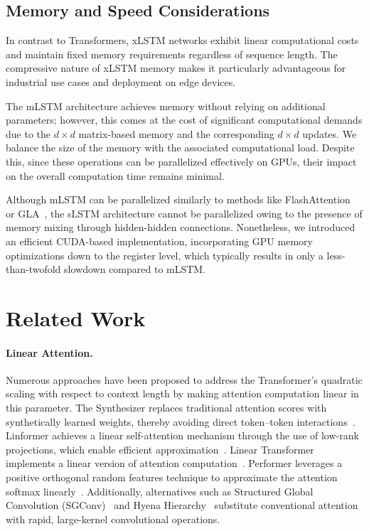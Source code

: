 \subsection{Memory and Speed Considerations}

In contrast to Transformers, xLSTM networks exhibit linear computational costs and maintain fixed memory requirements regardless of sequence length. The compressive nature of xLSTM memory makes it particularly advantageous for industrial use cases and deployment on edge devices.

The mLSTM architecture achieves memory without relying on additional parameters; however, this comes at the cost of significant computational demands due to the $d \times d$ matrix-based memory and the corresponding $d \times d$ updates. We balance the size of the memory with the associated computational load. Despite this, since these operations can be parallelized effectively on GPUs, their impact on the overall computation time remains minimal.

Although mLSTM can be parallelized similarly to methods like FlashAttention~\citep{Dao:22,Dao:23} or GLA~\citep{Yang:23arxiv}, the sLSTM architecture cannot be parallelized owing to the presence of memory mixing through hidden-hidden connections. Nonetheless, we introduced an efficient CUDA-based implementation, incorporating GPU memory optimizations down to the register level, which typically results in only a less-than-twofold slowdown compared to mLSTM.

\section{Related Work}
\label{sec:related}

\paragraph{Linear Attention.} Numerous approaches have been proposed to address the Transformer's quadratic scaling with respect to context length by making attention computation linear in this parameter. The Synthesizer replaces traditional attention scores with synthetically learned weights, thereby avoiding direct token--token interactions~\citep{Tay:20arxiv}. Linformer achieves a linear self-attention mechanism through the use of low-rank projections, which enable efficient approximation~\citep{Wang:20arxiv}. Linear Transformer implements a linear version of attention computation~\citep{Katharopoulos:20}. Performer leverages a positive orthogonal random features technique to approximate the attention softmax linearly~\citep{Choromanski:21}. Additionally, alternatives such as Structured Global Convolution (SGConv)~\citep{Li:22} and Hyena Hierarchy~\citep{Poli:23} substitute conventional attention with rapid, large-kernel convolutional operations.

